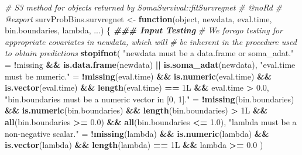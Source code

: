 \documentclass[
]{book}
\newenvironment{Shaded}{\begin{snugshade}}{\end{snugshade}}
\newcommand{\CommentTok}[1]{\textcolor[rgb]{0.56,0.35,0.01}{\textit{#1}}}
\newcommand{\ControlFlowTok}[1]{\textcolor[rgb]{0.13,0.29,0.53}{\textbf{#1}}}
\newcommand{\DocumentationTok}[1]{\textcolor[rgb]{0.56,0.35,0.01}{\textbf{\textit{#1}}}}
\newcommand{\FloatTok}[1]{\textcolor[rgb]{0.00,0.00,0.81}{#1}}
\newcommand{\FunctionTok}[1]{\textcolor[rgb]{0.13,0.29,0.53}{\textbf{#1}}}
\newcommand{\NormalTok}[1]{#1}
\newcommand{\OtherTok}[1]{\textcolor[rgb]{0.56,0.35,0.01}{#1}}
\newcommand{\SpecialCharTok}[1]{\textcolor[rgb]{0.81,0.36,0.00}{\textbf{#1}}}
\newcommand{\StringTok}[1]{\textcolor[rgb]{0.31,0.60,0.02}{#1}}
\begin{document}
\begin{Shaded}
\begin{Highlighting}[]
\CommentTok{\#\textquotesingle{} S3 method for objects returned by \textasciigrave{}SomaSurvival::fitSurvregnet\textasciigrave{}}
\CommentTok{\#\textquotesingle{} @noRd}
\CommentTok{\#\textquotesingle{} @export}
\NormalTok{survProbBins.survregnet }\OtherTok{\textless{}{-}} \ControlFlowTok{function}\NormalTok{(object, newdata, eval.time, bin.boundaries,}
\NormalTok{                                    lambda, ...) \{}
  \DocumentationTok{\#\#\# Input Testing}
  \CommentTok{\# We forego testing for appropriate covariates in \textasciigrave{}newdata\textasciigrave{}, which will}
  \CommentTok{\#   be inherent in the procedure used to obtain predictions}
  \FunctionTok{stopifnot}\NormalTok{(}
    \StringTok{"\textasciigrave{}newdata\textasciigrave{} must be a data.frame or soma\_adat."} \OtherTok{=} 
      \SpecialCharTok{!}\NormalTok{missing }\SpecialCharTok{\&\&} \FunctionTok{is.data.frame}\NormalTok{(newdata) }\SpecialCharTok{||} \FunctionTok{is.soma\_adat}\NormalTok{(newdata),}
    \StringTok{"\textasciigrave{}eval.time\textasciigrave{} must be numeric."} \OtherTok{=} 
      \SpecialCharTok{!}\FunctionTok{missing}\NormalTok{(eval.time) }\SpecialCharTok{\&\&} \FunctionTok{is.numeric}\NormalTok{(eval.time) }\SpecialCharTok{\&\&} 
      \FunctionTok{is.vector}\NormalTok{(eval.time) }\SpecialCharTok{\&\&} \FunctionTok{length}\NormalTok{(eval.time) }\SpecialCharTok{==}\NormalTok{ 1L }\SpecialCharTok{\&\&}\NormalTok{ eval.time }\SpecialCharTok{\textgreater{}} \FloatTok{0.0}\NormalTok{,}
    \StringTok{"\textasciigrave{}bin.boundaries\textasciigrave{} must be a numeric vector in [0, 1]."} \OtherTok{=} 
      \SpecialCharTok{!}\FunctionTok{missing}\NormalTok{(bin.boundaries) }\SpecialCharTok{\&\&} \FunctionTok{is.numeric}\NormalTok{(bin.boundaries) }\SpecialCharTok{\&\&}
      \FunctionTok{length}\NormalTok{(bin.boundaries) }\SpecialCharTok{\textgreater{}}\NormalTok{ 1L }\SpecialCharTok{\&\&} \FunctionTok{all}\NormalTok{(bin.boundaries }\SpecialCharTok{\textgreater{}=} \FloatTok{0.0}\NormalTok{) }\SpecialCharTok{\&\&} 
      \FunctionTok{all}\NormalTok{(bin.boundaries }\SpecialCharTok{\textless{}=} \FloatTok{1.0}\NormalTok{),}
    \StringTok{"\textasciigrave{}lambda\textasciigrave{} must be a non{-}negative scalar."} \OtherTok{=} 
      \SpecialCharTok{!}\FunctionTok{missing}\NormalTok{(lambda) }\SpecialCharTok{\&\&} \FunctionTok{is.numeric}\NormalTok{(lambda) }\SpecialCharTok{\&\&} 
      \FunctionTok{is.vector}\NormalTok{(lambda) }\SpecialCharTok{\&\&} \FunctionTok{length}\NormalTok{(lambda) }\SpecialCharTok{==}\NormalTok{ 1L }\SpecialCharTok{\&\&}\NormalTok{ lambda }\SpecialCharTok{\textgreater{}=} \FloatTok{0.0}
\NormalTok{  )}
  

\end{Highlighting}
\end{Shaded}
\end{document}
